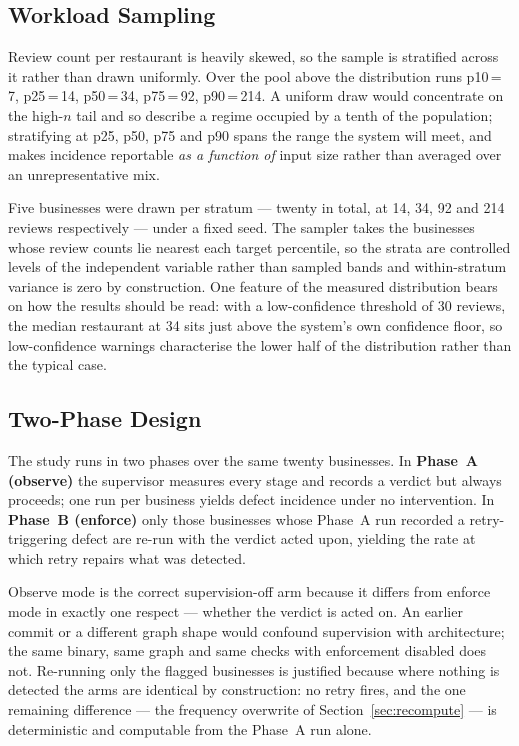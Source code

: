 \documentclass[runningheads]{llncs}
\begin{document}
\subsection{Workload Sampling}
\label{sec:sampling}

Review count per restaurant is heavily skewed, so the sample is stratified across
it rather than drawn uniformly. Over the pool above the distribution runs
p10\,=\,7, p25\,=\,14, p50\,=\,34, p75\,=\,92, p90\,=\,214. A uniform draw would
concentrate on the high-$n$ tail and so describe a regime occupied by a tenth of
the population; stratifying at p25, p50, p75 and p90 spans the range the system
will meet, and makes incidence reportable \emph{as a function of} input size
rather than averaged over an unrepresentative mix.

Five businesses were drawn per stratum --- twenty in total, at 14, 34, 92 and 214
reviews respectively --- under a fixed seed. The sampler takes the businesses
whose review counts lie nearest each target percentile, so the strata are
controlled levels of the independent variable rather than sampled bands and
within-stratum variance is zero by construction. One feature of the measured
distribution bears on how the results should be read: with a low-confidence
threshold of 30 reviews, the median restaurant at 34 sits just above the system's
own confidence floor, so low-confidence warnings characterise the lower half of
the distribution rather than the typical case.


\subsection{Two-Phase Design}

The study runs in two phases over the same twenty businesses. In \textbf{Phase~A
(observe)} the supervisor measures every stage and records a verdict but always
proceeds; one run per business yields defect incidence under no intervention. In
\textbf{Phase~B (enforce)} only those businesses whose Phase~A run recorded a
retry-triggering defect are re-run with the verdict acted upon, yielding the rate
at which retry repairs what was detected.

Observe mode is the correct supervision-off arm because it differs from enforce
mode in exactly one respect --- whether the verdict is acted on. An earlier commit
or a different graph shape would confound supervision with architecture; the same
binary, same graph and same checks with enforcement disabled does not. Re-running
only the flagged businesses is justified because where nothing is detected the
arms are identical by construction: no retry fires, and the one remaining
difference --- the frequency overwrite of Section~\ref{sec:recompute} --- is
deterministic and computable from the Phase~A run alone.
\end{document}
